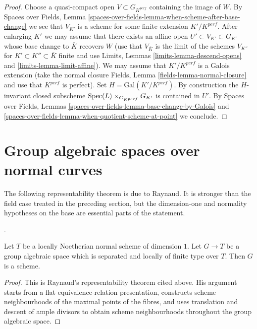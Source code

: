 \begin{proof}
\medskip\noindent
Choose a quasi-compact open $V \subset G_{K^{perf}}$ containing the
image of $W$. By Spaces over Fields,
Lemma \ref{spaces-over-fields-lemma-when-scheme-after-base-change}
we see that $V_{K'}$ is a scheme for some finite extension $K'/K^{perf}$.
After enlarging $K'$ we may assume that there exists an affine open
$U' \subset V_{K'} \subset G_{K'}$ whose base change to $\overline{K}$
recovers $W$ (use that $V_{\overline{K}}$ is the limit of the schemes
$V_{K''}$ for $K' \subset K'' \subset \overline{K}$ finite and use
Limits, Lemmas \ref{limits-lemma-descend-opens} and
\ref{limits-lemma-limit-affine}). We may assume
that $K'/K^{perf}$ is a Galois extension (take the normal closure
Fields, Lemma \ref{fields-lemma-normal-closure} and use
that $K^{perf}$ is perfect). Set $H = \text{Gal}(K'/K^{perf})$.
By construction the $H$-invariant closed subscheme
$\mathop{\mathrm{Spec}}(L) \times_{G_{K^{perf}}} G_{K'}$ is contained in $U'$.
By
Spaces over Fields, Lemmas
\ref{spaces-over-fields-lemma-base-change-by-Galois} and
\ref{spaces-over-fields-lemma-when-quotient-scheme-at-point} we conclude.
\end{proof}





\section{Group algebraic spaces over normal curves}
\label{section-group-spaces-normal-curves}

\noindent
The following representability theorem is due to Raynaud. It is stronger
than the field case treated in the preceding section, but the dimension-one
and normality hypotheses on the base are essential parts of the statement.

\begin{theorem}
\label{theorem-raynaud-group-space-scheme-dimension-one}
\begin{reference}
\cite[Th\'eor\`eme (3.3.1), pp. 40--41]{Raynaud}.
\end{reference}
Let $T$ be a locally Noetherian normal scheme of dimension $1$. Let
$G \to T$ be a group algebraic space which is separated and locally of
finite type over $T$. Then $G$ is a scheme.
\end{theorem}

\begin{proof}
This is Raynaud's representability theorem cited above. His argument starts
from a flat equivalence-relation presentation, constructs scheme
neighbourhoods of the maximal points of the fibres, and uses translation
and descent of ample divisors to obtain scheme neighbourhoods throughout
the group algebraic space.
\end{proof}





